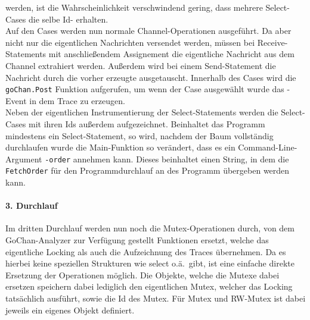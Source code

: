 werden, ist die Wahrscheinlichkeit verschwindend gering, dass mehrere 
Select-Cases die selbe Id- erhalten.\\Auf den Cases werden nun normale 
Channel-Operationen ausgeführt. Da aber nicht nur die eigentlichen 
Nachrichten versendet werden, müssen bei Receive-Statements mit anschließendem 
Assignement die eigentliche Nachricht aus dem Channel extrahiert werden. Außerdem 
wird bei einem Send-Statement die Nachricht durch die vorher erzeugte ausgetauscht.
Innerhalb des Cases wird die \texttt{goChan.Post} Funktion aufgerufen, um wenn 
der Case ausgewählt wurde das -Event in dem Trace zu erzeugen.\\
Neben der eigentlichen Instrumentierung der Select-Statements werden die Select-
Cases mit ihren Ids außerdem aufgezeichnet. Beinhaltet das Programm mindestens 
ein Select-Statement, so wird, nachdem der Baum vollständig durchlaufen wurde 
die Main-Funktion so verändert, dass es ein Command-Line-Argument \texttt{-order}
annehmen kann. Dieses beinhaltet einen String, in dem die \texttt{FetchOrder} für
den Programmdurchlauf an des Programm übergeben werden kann.
\paragraph{3. Durchlauf} Im dritten Durchlauf werden nun noch die Mutex-Operationen 
durch, von dem GoChan-Analyzer zur Verfügung gestellt Funktionen ersetzt, 
welche das eigentliche Locking als auch die Aufzeichnung des Traces übernehmen. 
Da es hierbei keine speziellen Strukturen wie select o.ä.\ gibt, ist eine 
einfache direkte Ersetzung der Operationen möglich. Die Objekte, welche die 
Mutexe dabei ersetzen speichern dabei lediglich den eigentlichen Mutex, welcher 
das Locking tatsächlich ausführt, sowie die Id des Mutex. Für Mutex und RW-Mutex 
ist dabei jeweils ein eigenes Objekt definiert.


